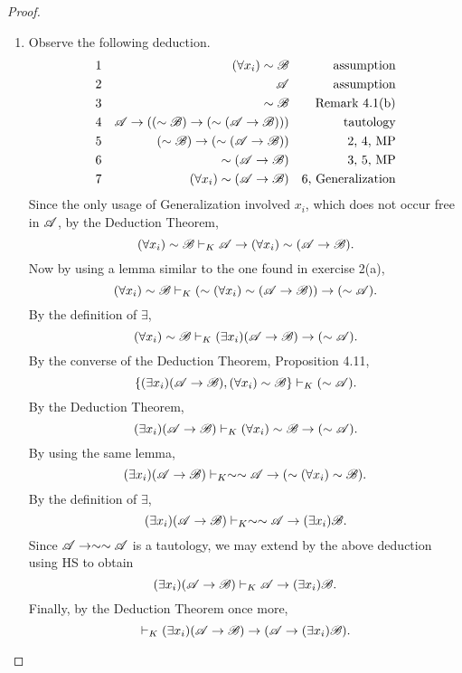 \begin{proposition}
\begin{proof}
\begin{enumerate}
\begin{enumerate}
          \item Observe the following deduction.
            \begin{align*}
              \text{1}&&
              (\forall x_i)\sim\mathscr{B}&&
              \text{assumption}\\
              \text{2}&&
              \mathscr{A}&&
              \text{assumption}\\
              \text{3}&&
              \sim\mathscr{B}&&
              \text{Remark 4.1(b)}\\
              \text{4}&&
              \mathscr{A} \rightarrow ((\sim\mathscr{B}) \rightarrow (\sim(\mathscr{A} \rightarrow \mathscr{B})))&&
              \text{tautology}\\
              \text{5}&&
              (\sim\mathscr{B}) \rightarrow (\sim(\mathscr{A} \rightarrow \mathscr{B}))&&
              \text{2, 4, MP}\\
              \text{6}&&
              \sim(\mathscr{A} \rightarrow \mathscr{B})&&
              \text{3, 5, MP}\\
              \text{7}&&
              (\forall x_i)\sim(\mathscr{A} \rightarrow \mathscr{B})&&
              \text{6, Generalization}
            \end{align*}
            Since the only usage of Generalization involved \(x_i\), which does not occur free in \(\mathscr{A}\), by the Deduction Theorem,
            \[(\forall x_i)\sim\mathscr{B} \vdash_{K} \mathscr{A} \rightarrow (\forall x_i)\sim(\mathscr{A} \rightarrow \mathscr{B}).\]
            Now by using a lemma similar to the one found in exercise 2(a),
            \[(\forall x_i)\sim\mathscr{B} \vdash_{K} (\sim(\forall x_i)\sim(\mathscr{A} \rightarrow \mathscr{B})) \rightarrow (\sim\mathscr{A}).\]
            By the definition of \(\exists\),
            \[(\forall x_i)\sim\mathscr{B} \vdash_{K} (\exists x_i)(\mathscr{A} \rightarrow \mathscr{B}) \rightarrow (\sim\mathscr{A}).\]
            By the converse of the Deduction Theorem, Proposition 4.11,
            \[\{(\exists x_i)(\mathscr{A} \rightarrow \mathscr{B}), (\forall x_i)\sim\mathscr{B}\} \vdash_{K} (\sim\mathscr{A}).\]
            By the Deduction Theorem,
            \[(\exists x_i)(\mathscr{A} \rightarrow \mathscr{B}) \vdash_{K} (\forall x_i)\sim\mathscr{B} \rightarrow (\sim\mathscr{A}).\]
            By using the same lemma,
            \[(\exists x_i)(\mathscr{A} \rightarrow \mathscr{B}) \vdash_{K} \sim\sim\mathscr{A} \rightarrow (\sim(\forall x_i)\sim\mathscr{B}).\]
            By the definition of \(\exists\),
            \[(\exists x_i)(\mathscr{A} \rightarrow \mathscr{B}) \vdash_{K} \sim\sim\mathscr{A} \rightarrow (\exists x_i)\mathscr{B}.\]
            Since \(\mathscr{A} \rightarrow \sim\sim\mathscr{A}\) is a tautology, we may extend by the above deduction using HS to obtain
            \[(\exists x_i)(\mathscr{A} \rightarrow \mathscr{B}) \vdash_{K} \mathscr{A} \rightarrow (\exists x_i)\mathscr{B}.\]
            Finally, by the Deduction Theorem once more,
            \[\vdash_{K} (\exists x_i)(\mathscr{A} \rightarrow \mathscr{B}) \rightarrow (\mathscr{A} \rightarrow (\exists x_i)\mathscr{B}).\]


\end{enumerate}
\end{enumerate}
\end{proof}
\end{proposition}
